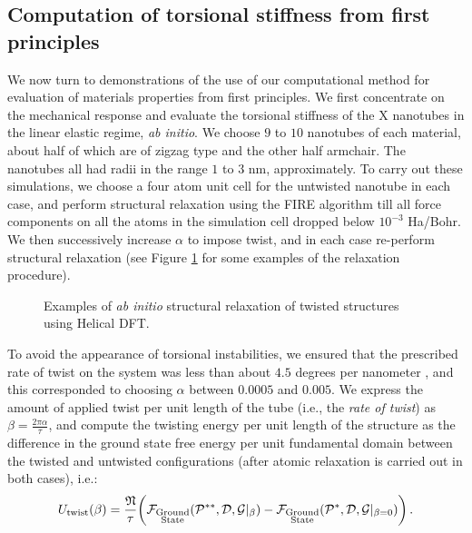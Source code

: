\documentclass[preprint,12pt, 3p, sort&compress]{elsarticle}
\begin{document}
\subsection{Computation of torsional stiffness from first principles}
\label{subsec:mechanical_simulations}
We now turn to demonstrations of the use of our computational method for evaluation of materials properties from first principles. We first concentrate on the mechanical response and evaluate the torsional stiffness of the X nanotubes in the linear elastic regime, \textit{ab initio}.  We choose $9$ to $10$ nanotubes of each material, about half of which are of zigzag type and the other half armchair. The nanotubes all had radii in the range $1$ to $3$ nm, approximately.  To carry out these simulations, we choose a four atom unit cell for the untwisted nanotube in each case, and perform structural relaxation using the FIRE algorithm \citep{bitzek2006structural} till all force components on all the atoms in the simulation cell dropped below $10^{-3}$ Ha/Bohr. We then successively increase $\alpha$ to impose twist, and in each case re-perform structural relaxation (see Figure \ref{fig:Fire_Relax} for some examples of the relaxation procedure). 
\begin{figure}[ht]
\centering
{}
\caption{Examples of \textit{ab initio} structural relaxation of twisted structures using Helical DFT.}
\label{fig:Fire_Relax}
\end{figure}
To avoid the appearance of torsional instabilities, we ensured that the prescribed rate of twist on the system was less than about $4.5$ degrees per nanometer \citep{Dumitrica_James_OMD}, and this corresponded to choosing $\alpha$ between $0.0005$ and $0.005$. We express the amount of applied twist per unit length of the tube (i.e., the \textit{rate of twist}) as $\displaystyle \beta = \frac{2\pi\alpha}{\tau}$, and compute the twisting energy per unit length of the structure as the difference in the ground state free energy per unit fundamental domain between the twisted and untwisted configurations (after atomic relaxation is carried out in both cases), i.e.:
\begin{align}
U_{\text{twist}}(\beta) = \frac{\mathfrak{N}}{\tau} \bigg({{\cal F}}_{\substack{\text{Ground}\\ \text{State}}}({\cal P}^{**} , {\cal D}, {\cal G}|_{\beta}) - {{\cal F}}_{\substack{\text{Ground}\\ \text{State}}}({\cal P}^{*}  , {\cal D}, {\cal G}|_{\beta=0})\bigg)\,.
\end{align}
\end{document}

